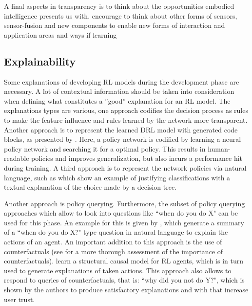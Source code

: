 \documentclass[twoside,11pt]{article}
\begin{document}
A final aspects in transparency is to think about the opportunities embodied intelligence presents us with. \citet{RoyEtAl:2021:RLRoboticsChallenges} encourage to think about other forms of sensors, sensor-fusion and new components to enable new forms of interaction and application areas and ways if learning

\subsection{Explainability}
Some explanations of developing RL models during the development phase are necessary. A lot of contextual information should be taken into consideration when defining what constitutes a ”good” explanation for an RL model. The explanations types are various, one approach \citet{LiuEtAl:2018:LinearModelUTrees} codifies the decision process as rules to make the feature influence and rules learned by the network more transparent. Another approach is to represent the learned DRL model with generated code blocks, as presented by \citet{VermaEtAl:2018:ProgrammaticallyInterpretableRL}. Here, a policy network is codified by learning a neural policy network and searching it for a optimal policy. This results in human-readable policies and improves generalization, but also incurs a performance hit during training. A third approach is to represent the network policies via natural language, such as \citet{AlonsoEtAl:2018:xAINLBeerClassifier} which show an example of justifying classifications with a textual explanation of the choice made by a decision tree.

Another approach is policy querying.
Furthermore, the subset of policy querying approaches which allow to look into questions like ``when do you do X" can be used for this phase.
An example for this is given by \citet{HayesShah:2017:AutonomousPolicyExplanation}, which generate a summary of a ``when do you do X?" type question in natural language to explain the actions of an agent. An important addition to this approach is the use of counterfactuals (see \citet{EvansEtAl:2021:ExplainabilityParadox} for a more thorough assessment of the importance of counterfactuals). \citet{MadumalEtAl:2020:CausalRLCFs} learn a structural causal model for RL agents, which is in turn used to generate explanations of taken actions. This approach also allows to respond to queries of counterfactuals, that is: ``why did you not do Y?", which is shown by the authors to produce satisfactory explanations and with that increase user trust.
\end{document}
